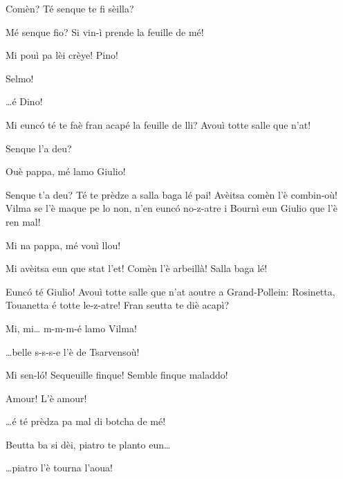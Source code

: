 \begin{drama}
\Selmospeaks Comèn? Té senque te fi sèilla?

\Pinospeaks{} Mé senque fio? Si vin-ì prende la feuille de mé!

\Selmospeaks{} Mi pouì pa lèi crèye! Pino!

\Pinospeaks Selmo!

\Dinospeaks \ldots é Dino!

\Selmospeaks{} Mi eunc\'o té te faè fran acapé la feuille de lli? Avouì totte salle que n'at!

\Pinospeaks{} Senque l'a deu?

\Vilmaspeaks Ouè pappa, mé lamo Giulio!

\Selmospeaks{} Senque t'a deu? Té te prèdze a salla baga lé pai! Avèitsa comèn l'è combin-où! Vilma se l'è maque pe lo non, n'en eunc\'o no-z-atre i Bournì eun Giulio que l'è ren mal!

\Vilmaspeaks Mi na pappa, mé vouì  llou!

\Selmospeaks{} Mi avèitsa eun que stat l'et! Comèn l'è arbeillà! Salla baga lé!

\Selmospeaks{} Eunc\'o té Giulio! Avouì totte salle que n'at aoutre a Grand-Pollein: Rosinetta, Touanetta é totte le-z-atre! Fran seutta te diè acapì?

\Giuliospeaks{} Mi, mi\ldots {} m-m-m-é lamo Vilma!


\Giuliospeaks \ldots belle s-s-s-e l'è de Tsarvensoù!

\Pinospeaks{} Mi sen-l\'o! Sequeuille finque!  Semble finque maladdo!

\Dinospeaks Amour! L'è amour!




\Selmospeaks \ldots é té prèdza pa mal di botcha de mé!

\Pinospeaks Beutta ba si dèi, piatro te planto eun\ldots

\Selmospeaks \ldots piatro l'è tourna l'aoua!


\end{drama}
